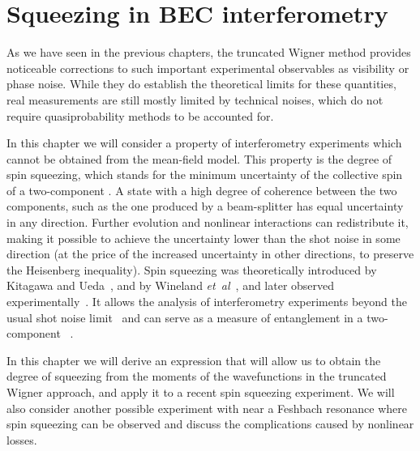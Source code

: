 \chapter{Squeezing in BEC interferometry}
\label{cha:bec-squeezing}

As we have seen in the previous chapters, the truncated Wigner method provides noticeable corrections to such important experimental observables as visibility or phase noise.
While they do establish the theoretical limits for these quantities, real measurements are still mostly limited by technical noises, which do not require quasiprobability methods to be accounted for.

In this chapter we will consider a property of  interferometry experiments which cannot be obtained from the mean-field model.
This property is the degree of spin squeezing, which stands for the minimum uncertainty of the collective spin of a two-component .
A state with a high degree of coherence between the two components, such as the one produced by a beam-splitter has equal uncertainty in any direction.
Further evolution and nonlinear interactions can redistribute it, making it possible to achieve the uncertainty lower than the shot noise in some direction (at the price of the increased uncertainty in other directions, to preserve the Heisenberg inequality).
Spin squeezing was theoretically introduced by Kitagawa and Ueda~\cite{Kitagawa1993}, and by Wineland \textit{et~al}~\cite{Wineland1994}, and later observed experimentally~\cite{Hald1999,Kuzmich2000}.
It allows the analysis of interferometry experiments beyond the usual shot noise limit~\cite{Riedel2010,Gross2010} and can serve as a measure of entanglement in a two-component ~\cite{Sorensen2001}.

In this chapter we will derive an expression that will allow us to obtain the degree of squeezing from the moments of the wavefunctions in the truncated Wigner approach, and apply it to a recent spin squeezing experiment.
We will also consider another possible experiment with  near a Feshbach resonance where spin squeezing can be observed and discuss the complications caused by nonlinear losses.






